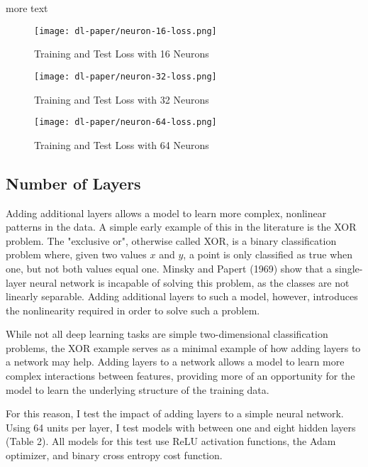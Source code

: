 \documentclass[12pt]{article}  %
\theoremstyle{definition}
\theoremstyle{remark}
\begin{document}
\par more text 

\begin{figure}[!htb]
  \texttt{[image: dl-paper/neuron-16-loss.png]}
  \caption{Training and Test Loss with 16 Neurons}\label{small-neuron-loss}
\endminipage\hfill
{}
  \texttt{[image: dl-paper/neuron-32-loss.png]}
  \caption{Training and Test Loss with 32 Neurons}\label{med-neuron-loss}
\endminipage\hfill
{}%
  \texttt{[image: dl-paper/neuron-64-loss.png]}
  \caption{Training and Test Loss with 64 Neurons}\label{large-neuron-loss}
\endminipage
\end{figure}

\subsection{Number of Layers}

\par Adding additional layers allows a model to learn more complex, nonlinear patterns in the data. A simple early example of this in the literature is the XOR problem. The "exclusive or", otherwise called XOR, is a binary classification problem where, given two values $x$ and $y$, a point is only classified as true when one, but not both values equal one. Minsky and Papert (1969) show that a single-layer neural network is incapable of solving this problem, as the classes are not linearly separable. Adding additional layers to such a model, however, introduces the nonlinearity required in order to solve such a problem. 
\par While not all deep learning tasks are simple two-dimensional classification problems, the XOR example serves as a minimal example of how adding layers to a network may help. Adding layers to a network allows a model to learn more complex interactions between features, providing more of an opportunity for the model to learn the underlying structure of the training data. 
\par For this reason, I test the impact of adding layers to a simple neural network. Using 64 units per layer, I test models with between one and eight hidden layers (Table 2). All models for this test use ReLU activation functions, the Adam optimizer, and binary cross entropy cost function. 
\end{document}
